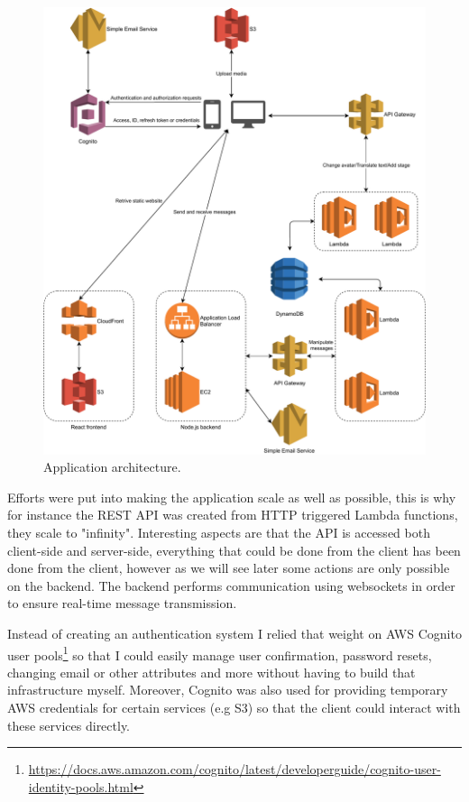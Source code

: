 \begin{figure}[H]
	\centering
	\includegraphics[width=\textwidth,keepaspectratio]{images/architecture/architecture.pdf}
	\caption{Application architecture.}
	\label{figure:application-architecture}
\end{figure}

Efforts were put into making the application scale as well as possible, this is why for instance the REST API was created from HTTP triggered Lambda functions, they scale to "infinity". Interesting aspects are that the API is accessed both client-side and server-side, everything that could be done from the client has been done from the client, however as we will see later some actions are only possible on the backend. The backend performs communication using websockets in order to ensure real-time message transmission.

Instead of creating an authentication system I relied that weight on AWS Cognito user pools\footnote{\href{https://docs.aws.amazon.com/cognito/latest/developerguide/cognito-user-identity-pools.html}{https://docs.aws.amazon.com/cognito/latest/developerguide/cognito-user-identity-pools.html}} so that I could easily manage user confirmation, password resets, changing email or other attributes and more without having to build that infrastructure myself. Moreover, Cognito was also used for providing temporary AWS credentials for certain services (e.g S3) so that the client could interact with these services directly.

